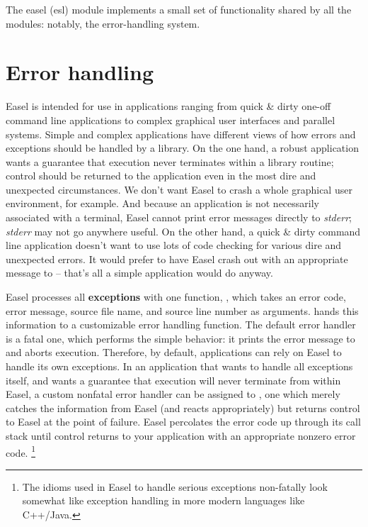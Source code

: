 The easel (esl) module implements a small set of functionality shared
by all the modules: notably, the error-handling system.

\section{Error handling}

Easel is intended for use in applications ranging from quick \& dirty
one-off command line applications to complex graphical user interfaces
and parallel systems. Simple and complex applications have different
views of how errors and exceptions should be handled by a library.  On
the one hand, a robust application wants a guarantee that execution
never terminates within a library routine; control should be returned
to the application even in the most dire and unexpected
circumstances. We don't want Easel to crash a whole graphical user
environment, for example. And because an application is not
necessarily associated with a terminal, Easel cannot print error
messages directly to \emph{stderr}; \emph{stderr} may not go anywhere
useful. On the other hand, a quick \& dirty command line application
doesn't want to use lots of code checking for various dire and
unexpected errors. It would prefer to have Easel crash out with an
appropriate message to  -- that's all a simple
application would do anyway.

Easel processes all \textbf{exceptions} with one function,
, which takes an error code, error message, source
file name, and source line number as arguments.  
hands this information to a customizable error handling function. The
default error handler is a fatal one, which performs the simple
behavior: it prints the error message to  and aborts
execution. Therefore, by default, applications can rely on Easel to
handle its own exceptions.  In an application that wants to handle all
exceptions itself, and wants a guarantee that execution will never
terminate from within Easel, a custom nonfatal error handler can be
assigned to , one which merely catches the
information from Easel (and reacts appropriately) but returns control
to Easel at the point of failure. Easel percolates the error code up
through its call stack until control returns to your application with
an appropriate nonzero error code. \footnote{The idioms used in Easel
to handle serious exceptions non-fatally look somewhat like exception
handling in more modern languages like C++/Java.}

